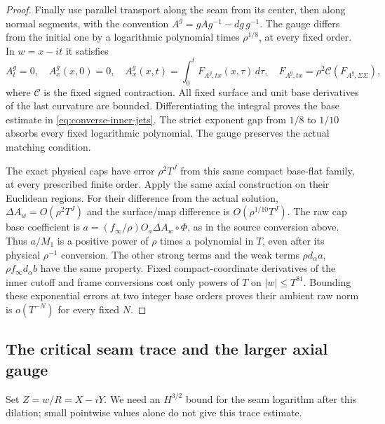 \documentclass[11pt]{amsart}
\theoremstyle{definition}
\theoremstyle{remark}
\theoremstyle{plain}
\begin{document}
\begin{proof}
Finally use parallel transport along the seam from its center,
then along normal segments, with the convention
$A^g=gAg^{-1}-dg\,g^{-1}$. The gauge differs from the initial
one by a logarithmic polynomial times $\rho^{1/8}$, at every
fixed order. In $w=x-it$ it satisfies
\begin{equation}\label{eq:converse-axial}
 A_t^g=0,\quad A_x^g(x,0)=0,\quad
 A_x^g(x,t)=\int_0^t F_{A^g,tx}(x,\tau)\,d\tau,\quad
 F_{A^g,tx}=\rho^2\mathcal C(F_{A^g,\Sigma\Sigma}),
\end{equation}
where $\mathcal C$ is the fixed signed contraction. All fixed
surface and unit base derivatives of the last curvature are
bounded. Differentiating the integral proves the base estimate
in \eqref{eq:converse-inner-jets}. The strict exponent gap
from $1/8$ to $1/10$ absorbs every fixed logarithmic polynomial.
The gauge preserves the actual matching condition.

The exact physical caps have error $\rho^2T^J$ from this same
compact base-flat family, at every prescribed finite order.
Apply the same axial construction on their Euclidean regions.
For their difference from the actual solution,
$\Delta A_w=O(\rho^2T^J)$ and the surface/map difference is
$O(\rho^{1/10}T^J)$. The raw cap base coefficient is
$a=(f_\infty/\rho)O_a\Delta A_w\circ\Phi$, as in the source
conversion above. Thus $a/M_1$ is a positive power of $\rho$
times a polynomial in $T$, even after its physical $\rho^{-1}$
conversion. The other strong terms and the weak terms
$\rho d_\alpha a$, $\rho f_\infty d_\alpha b$ have the same
property. Fixed compact-coordinate derivatives of the inner
cutoff and frame conversions cost only powers of $T$ on
$|w|\leq T^{81}$. Bounding these exponential errors at two
integer base orders proves their ambient raw norm is
$o(T^{-N})$ for every fixed $N$.
\end{proof}

\subsection{The critical seam trace and the larger axial gauge}

Set $Z=w/R=X-iY$. We need an $H^{3/2}$ bound for the seam
logarithm after this dilation; small pointwise values alone do not
give this trace estimate.
\end{document}
